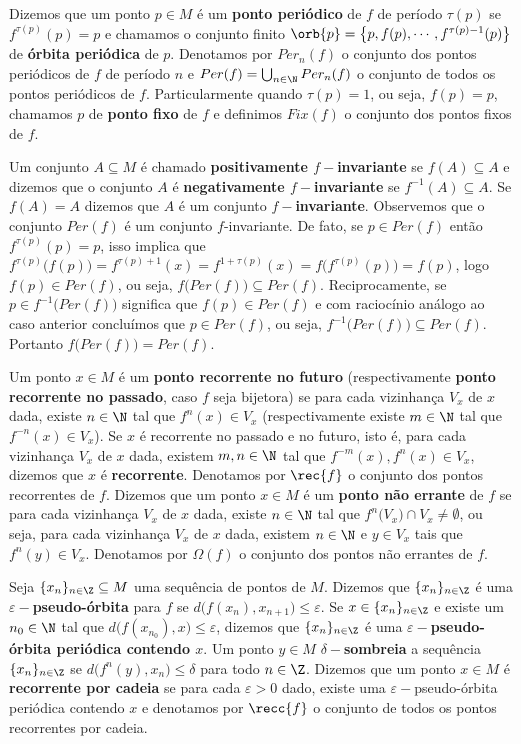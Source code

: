Dizemos que um ponto $p\in M$ é um \textbf{ponto periódico} de $f$ de período $\tau(p)$ se $f^{\tau(p)}(p)=p$ e chamamos o conjunto finito $\orb{p}=\big\{p,f(p),\cdots,f^{\tau(p)-1}(p)\big\}$ de \textbf{órbita periódica} de $p$. Denotamos por $Per_n(f)$ o conjunto dos pontos periódicos de $f$ de período $n$ e $Per(f)=\bigcup_{n\in\N} Per_n(f)$ o conjunto de todos os pontos periódicos de $f$. Particularmente quando $\tau(p)=1$, ou seja, $f(p)=p$, chamamos $p$ de \textbf{ponto fixo} de $f$ e definimos $Fix(f)$ o conjunto dos pontos fixos de $f$.

Um conjunto $A\subseteq M$ é chamado \textbf{positivamente $f-$invariante} se $f(A)\subseteq A$ e dizemos que o conjunto $A$ é \textbf{negativamente $f-$invariante} se $f^{-1}(A)\subseteq A$. Se $f(A)=A$ dizemos que $A$ é um conjunto \textbf{$f-$invariante}. Observemos que o conjunto $Per(f)$ é um conjunto $f$-invariante. De fato, se $p\in Per(f)$ então $f^{\tau(p)}(p)=p$, isso implica que $f^{\tau(p)}\big(f(p)\big)=f^{\tau(p)+1}(x)=f^{1+\tau(p)}(x)=f\big(f^{\tau(p)}(p)\big)=f(p)$, logo $f(p)\in Per(f)$, ou seja, $f\big(Per(f)\big)\subseteq Per(f)$. Reciprocamente, se $p\in f^{-1}\big(Per(f)\big)$ significa que $f(p)\in Per(f)$ e com raciocínio análogo ao caso anterior concluímos que $p\in Per(f)$, ou seja, $f^{-1}\big(Per(f)\big)\subseteq Per(f)$. Portanto $f\big(Per(f)\big)=Per(f)$. 

Um ponto $x\in M$ é um \textbf{ponto recorrente no futuro} (respectivamente \textbf{ponto recorrente no passado}, caso $f$ seja bijetora) se para cada vizinhança $V_x$ de $x$ dada, existe $n\in\N$ tal que $f^n(x)\in V_x$ (respectivamente existe $m\in\N$ tal que $f^{-n}(x)\in V_x$). Se $x$ é recorrente no passado e no futuro, isto é, para cada vizinhança $V_x$ de $x$ dada, existem $m,n\in\N$ tal que $f^{-m}(x),f^n(x)\in V_x$, dizemos que $x$ é \textbf{recorrente}. Denotamos por $\rec{f}$ o conjunto dos pontos recorrentes de $f$. Dizemos que um ponto $x\in M$ é um \textbf{ponto não errante} de $f$ se para cada vizinhança $V_x$ de $x$ dada, existe $n\in\N$ tal que $f^n\big(V_x\big)\cap V_x\neq\emptyset$, ou seja, para cada vizinhança $V_x$ de $x$ dada, existem $n\in\N$ e $y\in V_x$ tais que $f^n(y)\in V_x$. Denotamos por $\Omega(f)$ o conjunto dos pontos não errantes de $f$.

Seja $\{x_n\}_{n\in\Z}\subseteq M$ uma sequência de pontos de $M$. Dizemos que $\{x_n\}_{n\in\Z}$ é uma \textbf{$\varepsilon-$pseudo-órbita} para $f$ se $d\big(f(x_n),x_{n+1}\big)\leq\varepsilon$. Se $x\in\{x_n\}_{n\in\Z}$ e existe um $n_0\in\N$ tal que $d\big(f(x_{n_0}),x\big)\leq\varepsilon$, dizemos que $\{x_n\}_{n\in\Z}$ é uma \textbf{$\varepsilon-$pseudo-órbita periódica contendo $x$}. Um ponto $y\in M$ \textbf{$\delta-$sombreia} a sequência $\{x_n\}_{n\in\Z}$ se $d\big(f^n(y),x_{n}\big)\leq\delta$ para todo $n\in\Z$. Dizemos que um ponto $x\in M$ é \textbf{recorrente por cadeia} se para cada $\varepsilon>0$ dado, existe uma $\varepsilon-$pseudo-órbita periódica contendo $x$ e denotamos por $\recc{f}$ o conjunto de todos os pontos recorrentes por cadeia.

